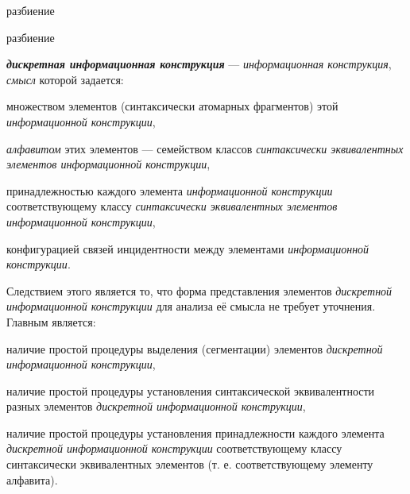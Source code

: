 \begin{SCn}

    \begin{scnrelfromset}{разбиение}
            \begin{scnindent}
            \end{scnindent}
            \begin{scnindent}
            \begin{scnrelfromset}{разбиение}
            \end{scnrelfromset}
            \end{scnindent}
    \end{scnrelfromset}

\end{SCn}

\textit{\textbf{дискретная информационная конструкция}} --- \textit{информационная конструкция}, \textit{смысл} которой задается:
\begin{textitemize}
    \item множеством элементов (синтаксически атомарных фрагментов) этой \textit{информационной конструкции},
    \item \textit{алфавитом} этих элементов --- семейством классов \textit{синтаксически эквивалентных элементов информационной конструкции},
    \item принадлежностью каждого элемента \textit{информационной конструкции} соответствующему классу \textit{синтаксически эквивалентных элементов информационной конструкции},
    \item конфигурацией связей инцидентности между элементами \textit{информационной конструкции}.
\end{textitemize}

Следствием этого является то, что форма представления элементов \textit{дискретной информационной конструкции} для анализа её смысла не требует уточнения.
Главным является:
\begin{textitemize}
    \item наличие простой процедуры выделения (сегментации) элементов \textit{\textit{дискретной информационной конструкции}},
    \item наличие простой процедуры установления синтаксической эквивалентности разных элементов \textit{дискретной информационной конструкции},
    \item наличие простой процедуры установления принадлежности каждого элемента \textit{дискретной информационной конструкции} соответствующему классу синтаксически эквивалентных элементов (т. е. соответствующему элементу алфавита).
\end{textitemize}

